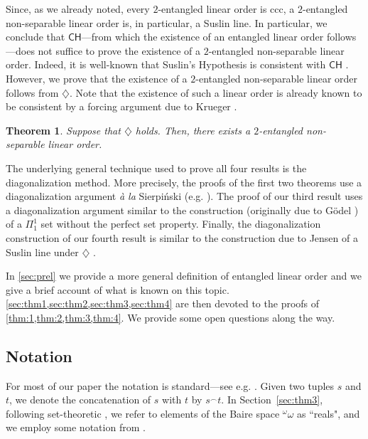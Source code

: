 \documentclass[12pt]{amsart}
\newtheorem{maintheorem}{Theorem}
\theoremstyle{definition}
\theoremstyle{remark}
\begin{document}
Since, as we already noted, every $2$-entangled linear order is ccc, a $2$-entangled non-separable linear order is, in particular, a Suslin line. In particular, we conclude that $\mathsf{CH}$---from which the existence of an entangled linear order follows---does not suffice to prove the existence of a $2$-entangled non-separable linear order. Indeed, it is well-known that Suslin's Hypothesis is consistent with $\mathsf{CH}$ \cite{zbMATH03453594}. However, we prove that the existence of a $2$-entangled non-separable linear order follows from $\diamondsuit$. Note that the existence of such a linear order is already known to be consistent by a forcing argument due to Krueger \cite{MR4080091}. 


\begin{maintheorem}\label{thm:4}
Suppose that $\diamondsuit$ holds. Then, there exists a $2$-entangled non-separable linear order.
\end{maintheorem}

The underlying general technique used to prove all four results is the diagonalization method. More precisely, the proofs of the first two theorems use a diagonalization argument \emph{à la} Sierpi\'{n}ski (e.g. \cite{zbMATH02598169, zbMATH03124831}). The proof of our third result uses a diagonalization argument similar to the construction (originally due to G\"{o}del \cite[p. 170]{MR2731169}) of a $\Pi_1^1$ set without the perfect set property. Finally, the diagonalization construction of our fourth result is similar to the construction due to Jensen of a Suslin line under $\diamondsuit$ \cite{MR756630, Devlin:1984aa}.


In \cref{sec:prel} we provide a more general definition of entangled linear order and we give a brief account of what is known on this topic.
\cref{sec:thm1,sec:thm2,sec:thm3,sec:thm4} are then devoted to the proofs of \cref{thm:1,thm:2,thm:3,thm:4}. We provide some open questions along the way.


\subsection*{Notation} For most of our paper the notation is standard---see e.g. \cite{MR1321597, MR1940513}. Given two tuples $s$ and $t$, we denote the concatenation of $s$ with $t$ by $s^\smallfrown t$. In Section~\ref{sec:thm3}, following set-theoretic , we refer to elements of the Baire space ${}^\omega \omega$ as ``reals", and we employ some notation from \cite{MR2731169}.
\end{document}

